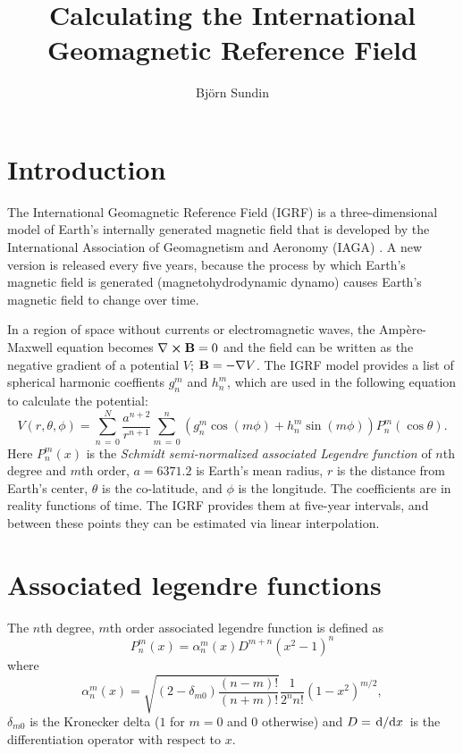 \documentclass[12pt]{article}
\title{\vspace{-2.5em}Calculating the International Geomagnetic Reference Field}
\author{Björn Sundin}
\begin{document}
\maketitle

\section{Introduction}
The International Geomagnetic Reference Field (IGRF) is a three-dimensional model of Earth's internally generated magnetic field that is developed by the International Association of Geomagnetism and Aeronomy (IAGA) \parencite{Alken2021}. A new version is released every five years, because the process by which Earth's magnetic field is generated (magnetohydrodynamic dynamo) causes Earth's magnetic field to change over time.

In a region of space without currents or electromagnetic waves, the Ampère-Maxwell equation becomes $\nabla\crossproduct\vect{B} = 0$ and the field can be written as the negative gradient of a potential $V$; $\boldsymbol{\mathbf{B}} = -\nabla V$. The IGRF model provides a list of spherical harmonic coeffients $g_n^m$ and $h_n^m$, which are used in the following equation to calculate the potential:
\begin{equation}
  V(r, \theta, \phi) = \sum_{n\,=\,0}^N\frac{a^{n+2}}{r^{n+1}}\sum_{m\,=\,0}^n\left(g_n^m\cos(m\phi) + h_n^m\sin(m\phi)\right)P_n^m(\cos\theta).
\end{equation}
Here $P_n^m(x)$ is the \textit{Schmidt semi-normalized associated Legendre function} of $n$th degree and $m$th order, $a = 6371.2$ is Earth's mean radius, $r$ is the distance from Earth's center, $\theta$ is the co-latitude, and $\phi$ is the longitude. The coefficients are in reality functions of time. The IGRF provides them at five-year intervals, and between these points they can be estimated via linear interpolation.

\section{Associated legendre functions}

The $n$th degree, $m$th order associated legendre function is defined as
\begin{equation}
  P_n^m(x) = \alpha_n^m(x)D^{m+n}(x^2-1)^n
\end{equation}
where
\begin{equation}
  \alpha_n^m(x) = \sqrt{(2-\delta_{m0})\frac{(n-m)!}{(n+m)!}}\frac{1}{2^nn!}(1-x^2)^{m/2},
\end{equation}
$\delta_{m0}$ is the Kronecker delta ($1$ for $m=0$ and $0$ otherwise) and $D = \derivative*{x}$ is the differentiation operator with respect to $x$.
\end{document}
